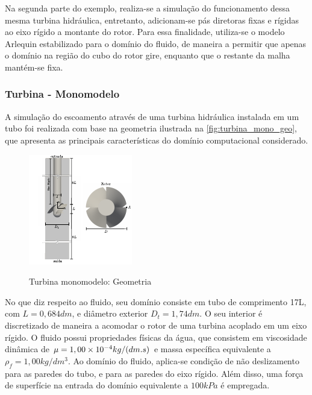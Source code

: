 Na segunda parte do exemplo, realiza-se a simulação do funcionamento dessa mesma turbina hidráulica, entretanto, adicionam-se pás diretoras fixas e rígidas ao eixo rígido a montante do rotor. Para essa finalidade, utiliza-se o modelo Arlequin estabilizado para o domínio do fluido, de maneira a permitir que apenas o domínio na região do cubo do rotor gire, enquanto que o restante da malha mantém-se fixa.   

\subsubsection{Turbina - Monomodelo}

A simulação do escoamento através de uma turbina hidráulica instalada em um tubo foi realizada com base na geometria ilustrada na \autoref{fig:turbina_mono_geo}, que apresenta as principais características do domínio computacional considerado.

\begin{figure}[!htbp]
	\caption{Turbina monomodelo: Geometria}
	\centering 
	\includegraphics[scale=3.0,trim=0cm 0cm 0cm 0cm, clip=true]{Imagens/Cap7/turbina_mono_geo.pdf}	
	\label{fig:turbina_mono_geo}
\end{figure}

No que diz respeito ao fluido, seu domínio consiste em tubo de comprimento 17L, com $L = 0,684dm$, e diâmetro exterior $D_t = 1,74dm$. O seu interior é discretizado de maneira a acomodar o rotor de uma turbina acoplado em um eixo rígido. O fluido possui propriedades físicas da água, que consistem em viscosidade dinâmica de $\mu=1,00\times10^{-4} kg/(dm.s)$ e massa específica equivalente a $\rho_{f} = 1,00 kg/dm^3 $. Ao domínio do fluido, aplica-se condição de não deslizamento para as paredes do tubo, e para as paredes do eixo rígido. Além disso, uma força de superfície na entrada do domínio equivalente a $100kPa$ é empregada.

